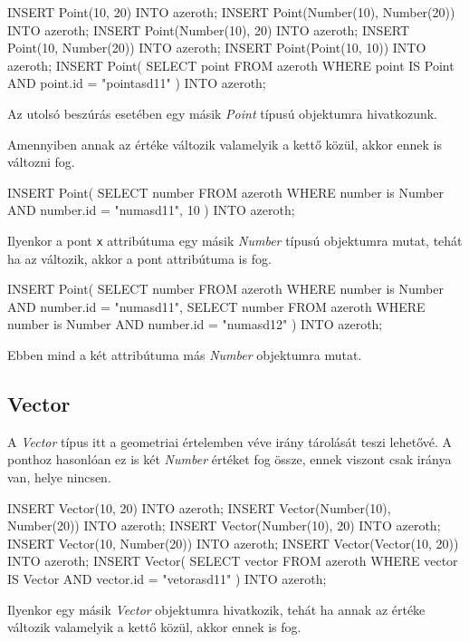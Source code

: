 \begin{sql}
INSERT Point(10, 20) INTO azeroth;
INSERT Point(Number(10), Number(20)) INTO azeroth;
INSERT Point(Number(10), 20) INTO azeroth;
INSERT Point(10, Number(20)) INTO azeroth;
INSERT Point(Point(10, 10)) INTO azeroth;
INSERT Point(
    SELECT point FROM azeroth
    WHERE point IS Point AND point.id = "pointasd11"
) INTO azeroth;
\end{sql}

Az utolsó beszúrás esetében egy másik \textit{Point} típusú objektumra hivatkozunk.

\noindent Amennyiben annak az értéke változik valamelyik a kettő közül, akkor ennek is változni fog.

\begin{sql}
INSERT Point(
    SELECT number FROM azeroth
    WHERE number is Number AND number.id = "numasd11", 10
) INTO azeroth;
\end{sql}

Ilyenkor a pont \texttt{x} attribútuma egy másik \textit{Number} típusú objektumra mutat, tehát ha az változik, akkor a pont attribútuma is fog.

\begin{sql}
INSERT Point(
    SELECT number FROM azeroth
    WHERE number is Number AND number.id = "numasd11",
    SELECT number FROM azeroth
    WHERE number is Number AND number.id = "numasd12"
) INTO azeroth;
\end{sql}

Ebben mind a két attribútuma más \textit{Number} objektumra mutat.

\subsection{Vector}

A \textit{Vector} típus itt a geometriai értelemben véve irány tárolását teszi lehetővé. A ponthoz hasonlóan ez is két \textit{Number} értéket fog össze, ennek viszont csak iránya van, helye nincsen.

\begin{sql}
INSERT Vector(10, 20) INTO azeroth;
INSERT Vector(Number(10), Number(20)) INTO azeroth;
INSERT Vector(Number(10), 20) INTO azeroth;
INSERT Vector(10, Number(20)) INTO azeroth;
INSERT Vector(Vector(10, 20)) INTO azeroth;
INSERT Vector(
    SELECT vector FROM azeroth
    WHERE vector IS Vector AND vector.id = "vetorasd11"
) INTO azeroth;
\end{sql}

Ilyenkor egy másik \textit{Vector} objektumra hivatkozik, tehát ha annak az értéke változik valamelyik a kettő közül, akkor ennek is fog.

